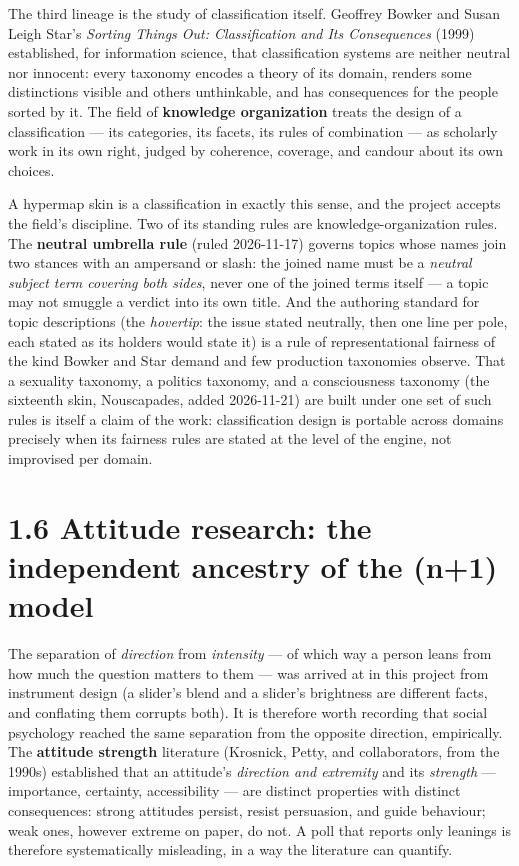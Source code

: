 The third lineage is the study of classification itself. Geoffrey Bowker
and Susan Leigh Star's \emph{Sorting Things Out: Classification and Its
Consequences} (1999) established, for information science, that
classification systems are neither neutral nor innocent: every taxonomy
encodes a theory of its domain, renders some distinctions visible and
others unthinkable, and has consequences for the people sorted by it.
The field of \textbf{knowledge organization} treats the design of a
classification --- its categories, its facets, its rules of combination
--- as scholarly work in its own right, judged by coherence, coverage,
and candour about its own choices.

A hypermap skin is a classification in exactly this sense, and the
project accepts the field's discipline. Two of its standing rules are
knowledge-organization rules. The \textbf{neutral umbrella rule} (ruled
2026-11-17) governs topics whose names join two stances with an
ampersand or slash: the joined name must be a \emph{neutral subject term
covering both sides}, never one of the joined terms itself --- a topic
may not smuggle a verdict into its own title. And the authoring standard
for topic descriptions (the \emph{hovertip}: the issue stated neutrally,
then one line per pole, each stated as its holders would state it) is a
rule of representational fairness of the kind Bowker and Star demand and
few production taxonomies observe. That a sexuality taxonomy, a politics
taxonomy, and a consciousness taxonomy (the sixteenth skin, Nouscapades,
added 2026-11-21) are built under one set of such rules is itself a
claim of the work: classification design is portable across domains
precisely when its fairness rules are stated at the level of the engine,
not improvised per domain.

\section{1.6 Attitude research: the independent ancestry of the (n+1)
model}\label{attitude-research-the-independent-ancestry-of-the-n1-model}

The separation of \emph{direction} from \emph{intensity} --- of which
way a person leans from how much the question matters to them --- was
arrived at in this project from instrument design (a slider's blend and
a slider's brightness are different facts, and conflating them corrupts
both). It is therefore worth recording that social psychology reached
the same separation from the opposite direction, empirically. The
\textbf{attitude strength} literature (Krosnick, Petty, and
collaborators, from the 1990s) established that an attitude's
\emph{direction and extremity} and its \emph{strength} --- importance,
certainty, accessibility --- are distinct properties with distinct
consequences: strong attitudes persist, resist persuasion, and guide
behaviour; weak ones, however extreme on paper, do not. A poll that
reports only leanings is therefore systematically misleading, in a way
the literature can quantify.

